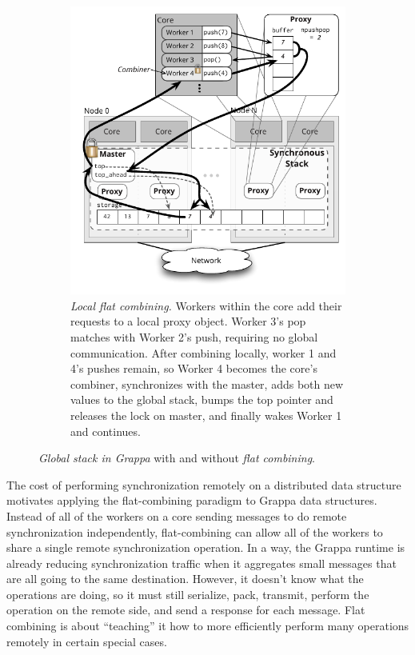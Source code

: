 \begin{figure}[t]
\begin{subfigure}[b]{0.43\textwidth}
    \includegraphics[width=\textwidth]{figs/stack_fc.pdf}
    \caption{\emph{Local flat combining.}
      Workers within the core add their requests to a local proxy object. Worker 3's pop matches with Worker 2's push, requiring no global communication. After combining locally, worker 1 and 4's pushes remain, so Worker 4 becomes the core's combiner, synchronizes with the master, adds both new values to the global stack, bumps the top pointer and releases the lock on master, and finally wakes Worker 1 and continues.
    }
    \label{fig:stackfc}
  \end{subfigure}
  \caption{\emph{Global stack in Grappa} with and without \emph{flat combining}.}
  \label{fig:stack}
\end{figure}

The cost of performing synchronization remotely on a distributed data structure motivates applying the flat-combining paradigm to Grappa data structures. Instead of all of the workers on a core sending messages to do remote synchronization independently, flat-combining can allow all of the workers to share a single remote synchronization operation. In a way, the Grappa runtime is already reducing synchronization traffic when it aggregates small messages that are all going to the same destination. However, it doesn't know what the operations are doing, so it must still serialize, pack, transmit, perform the operation on the remote side, and send a response for each message. Flat combining is about ``teaching'' it how to more efficiently perform many operations remotely in certain special cases.

